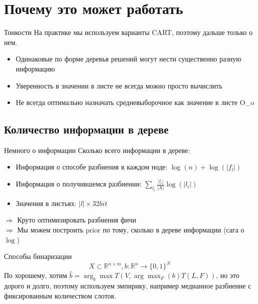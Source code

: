 \documentclass[14pt, fleqn, xcolor={dvipsnames, table}]{beamer}
\begin{document}
\section{Почему это может работать}
\begin{frame}{Тонкости}
На практике мы используем варианты CART, поэтому дальше только о нем.
\begin{itemize}
  \item Одинаковые по форме деревья решений могут нести существенно разную информацию
  \item Уверенность в значении в листе не всегда можно просто вычислить
  \item Не всегда оптимально назначать средневыборочное как значение в листе O\_o
\end{itemize}
\end{frame}

\subsection{Количество информации в дереве}

\begin{frame}{Немного о информации}
Сколько всего информации в дереве:
\begin{itemize}
  \item Информация о способе разбиения в каждом ноде: $\log(n) + \log(|f_l|)$
  \item Информация о получившемся разбиении: $\sum_{l_i} \frac{|l_i|}{|X|} \log (|l_i|)$
  \item Значения в листьях: $|l|\times32bit$
\end{itemize}
$\Rightarrow$ Круто оптимизировать разбиения фичи \\
$\Rightarrow$ Мы можем построить prior по тому, сколько в дереве информации (сага о $\log$)
\end{frame}

\begin{frame}{Способы бинаризации}
\small
$$
X \subset \mathbb{R}^{n\times m}, b: \mathbb{R}^n \to \{0,1\}^N
$$
По хорошему, хотим $\hat{b} = \arg_b \max T\left(V,\arg \max_F(b) T(L,F)\right)$, но это дорого и долго, поэтому используем эмпирику, например медианное разбиение с фиксированным количеством слотов.
\end{frame}
\end{document}
